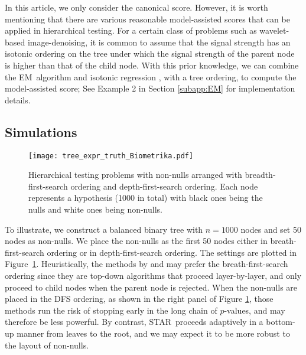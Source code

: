 \documentclass{biometrika}
\renewcommand{\star}{STAR}
\newcommand{\EM}{EM}
\newcommand{\1}{\mathbf{1}}
\begin{document}
In this article, we only consider the canonical score. However, it is worth mentioning that there are various reasonable model-assisted scores that can be applied in hierarchical testing. For a certain class of problems such as wavelet-based image-denoising, it is common to assume that the signal strength has an isotonic ordering on the tree under which the signal strength of the parent node is higher than that of the child node. With this prior knowledge, we can combine the \EM ~algorithm and isotonic regression \citep[e.g.,][]{best90, mair09, stout13}, with a tree ordering, to compute the model-assisted score; See Example 2 in Section \ref{subapp:EM} for implementation details.


\subsection{Simulations}

\begin{figure}[h]
  \centering
  \texttt{[image: tree\_expr\_truth\_Biometrika.pdf]}
  \caption{Hierarchical testing problems with non-nulls arranged with breadth-first-search ordering and depth-first-search ordering. Each node represents a hypothesis (1000 in total) with black ones being the nulls and white ones being non-nulls.}\label{fig:tree_expr_truth}
\end{figure}

To illustrate, we construct a balanced binary tree with $n = 1000$ nodes and set 50 nodes as non-nulls. We place the non-nulls as the first 50 nodes either in breath-first-search ordering or in depth-first-search ordering. The settings are plotted in Figure~\ref{fig:tree_expr_truth}. Heuristically, the methods by \cite{yekutieli08} and \cite{lynch16} may prefer the breath-first-search ordering since they are top-down algorithms that proceed layer-by-layer, and only proceed to child nodes when the parent node is rejected. When the non-nulls are placed in the DFS ordering, as shown in the right panel of Figure \ref{fig:tree_expr_truth}, those methods run the risk of stopping early in the long chain of $p$-values, and may therefore be less powerful. By contrast, \star ~proceeds adaptively in a bottom-up manner from leaves to the root, and we may expect it to be more robust to the layout of non-nulls. 
\end{document}
